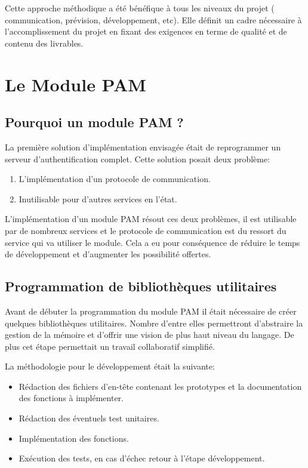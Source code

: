     Cette approche méthodique a été bénéfique à tous les niveaux du projet (
    communication, prévision, développement, etc). Elle définit un cadre
    nécessaire à l'accomplissement du projet en fixant des exigences en terme de
    qualité et de contenu des livrables.
  


\section{Le Module PAM}
\subsection{Pourquoi un module PAM ?}
La première solution d'implémentation envisagée était de reprogrammer un
serveur d'authentification complet. Cette solution posait deux problème:
\begin{enumerate}
  \item L'implémentation d'un protocole de communication.
  \item Inutilisable pour d'autres services en l'état.
\end{enumerate}

L'implémentation d'un module PAM résout ces deux problèmes, il est utilisable
par de nombreux services et le protocole de communication est du ressort du
service qui va utiliser le module. Cela a eu pour conséquence de réduire le
temps de développement et d'augmenter les possibilité offertes.

\subsection{Programmation de bibliothèques utilitaires}
Avant de débuter la programmation du module PAM il était nécessaire de créer
quelques bibliothèques utilitaires. Nombre d'entre elles permettront
d'abstraire la gestion de la mémoire et d'offrir une vision de plus haut niveau
du langage. De plus cet étape permettait un travail collaboratif simplifié.

La méthodologie pour le développement était la suivante:
\begin{itemize}
  \item Rédaction des fichiers d'en-tête contenant les prototypes et la 
  documentation des fonctions à implémenter. 
  \item Rédaction des éventuels test unitaires.
  \item Implémentation des fonctions.
  \item Exécution des tests, en cas d'échec retour à l'étape développement.
\end{itemize}

